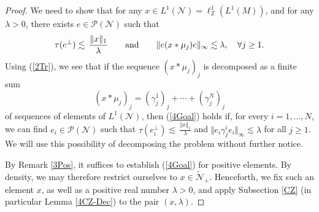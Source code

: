 \documentclass[12pt]{amsart}
\newcommand{\N}{\mbox{${\mathcal N}$}}
\renewcommand{\P}{\mbox{${\mathcal P}$}}
\newcommand{\norm}[1]{\Vert#1\Vert}
\theoremstyle{remark}
\theoremstyle{definition}
\numberwithin{equation}{section}
\begin{document}
\begin{proof}
We need to show that for any $x \in L^1(\N)=\ell^1_{\mathbb Z}(L^1(M))$,
and for any $\lambda>0$, there exists $e\in\P(\N)$ such that 
\begin{equation}\label{4Goal}
\tau(e^\perp) \lesssim \,\frac{\norm{x}_1}{\lambda}
\qquad\hbox{and}\qquad \norm{e(x*\mu_j)e}_\infty\lesssim\lambda,\quad \forall j\geq 1.
\end{equation}
Using (\ref{2Tr}), we see that if the sequence $(x*\mu_j)_{j}$ is decomposed
as a finite sum
$$
(x*\mu_j)_{j} = (\gamma_j^1)_j+\cdots +(\gamma_j^N)_j
$$
of sequences of elements of $L^1(\N)$, then 
(\ref{4Goal}) holds 
if, for every $i=1,\ldots,N$, we can find $e_i\in\P(\N)$ such that
$\tau(e_i^\perp) \lesssim \,\frac{\norm{x}_1}{\lambda}$
and $\norm{e_i\gamma_j^{i}e_i}_\infty\lesssim\lambda$ for all $j\geq 1$.
We will use this possibility of decomposing the problem without further notice.


By Remark \ref{3Pos}, it suffices to establish (\ref{4Goal})
for positive elements. By density, we may therefore restrict ourselves to $x\in\widetilde{\N}_+$.
Henceforth, we fix such an element $x$, as well as a positive real number $\lambda >0$, and apply Subsection
\ref{CZ} (in particular Lemma \ref{4CZ-Dec}) to the pair $(x,\lambda)$.




\end{proof}
\end{document}
